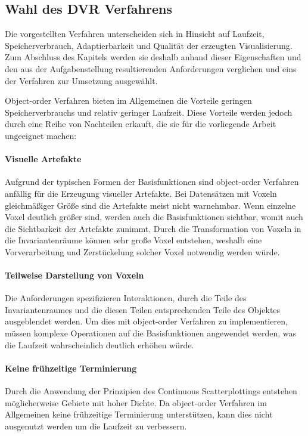 \documentclass[a4paper,fontsize=12pt,toc=bib,halfparskip,ngerman]{scrartcl}
\begin{document}
\subsection{Wahl des DVR Verfahrens}
Die vorgestellten Verfahren unterscheiden sich in Hinsicht auf Laufzeit, Speicherverbrauch, Adaptierbarkeit und Qualit\"at der erzeugten Visualisierung. Zum Abschluss des Kapitels werden sie deshalb anhand dieser Eigenschaften und den aus der Aufgabenstellung resultierenden Anforderungen verglichen und eins der Verfahren zur Umsetzung ausgew\"ahlt.

Object-order Verfahren bieten im Allgemeinen die Vorteile geringen Speicherverbrauchs und relativ geringer Laufzeit. Diese Vorteile werden jedoch durch eine Reihe von Nachteilen erkauft, die sie f\"ur die vorliegende Arbeit ungeeignet machen:


\paragraph{Visuelle Artefakte} Aufgrund der typischen Formen der Basisfunktionen sind object-order Verfahren anf\"allig f\"ur die Erzeugung visueller Artefakte. Bei Datens\"atzen mit Voxeln gleichm\"a{\ss}iger Gr\"o{\ss}e sind die Artefakte meist nicht warnehmbar. Wenn einzelne Voxel deutlich gr\"o{\ss}er sind, werden auch die Basisfunktionen sichtbar, womit auch die Sichtbarkeit der Artefakte zunimmt. Durch die Transformation von Voxeln in die Invariantenr\"aume k\"onnen sehr gro{\ss}e Voxel entstehen, weshalb eine Vorverarbeitung und Zerst\"uckelung solcher Voxel notwendig werden w\"urde.

\paragraph{Teilweise Darstellung von Voxeln} Die Anforderungen spezifizieren Interaktionen, durch die Teile des Invariantenraumes und die diesen Teilen entsprechenden Teile des Objektes ausgeblendet werden. Um dies mit object-order Verfahren zu implementieren, m\"ussen komplexe Operationen auf die Basisfunktionen angewendet werden, was die Laufzeit wahrscheinlich deutlich erh\"ohen w\"urde.

\paragraph{Keine fr\"uhzeitige Terminierung} Durch die Anwendung der Prinzipien des Continuous Scatterplottings entstehen m\"oglicherweise Gebiete mit hoher Dichte. Da object-order Verfahren im Allgemeinen keine fr\"uhzeitige Terminierung unterst\"utzen, kann dies nicht ausgenutzt werden um die Laufzeit zu verbessern.
\end{document}
